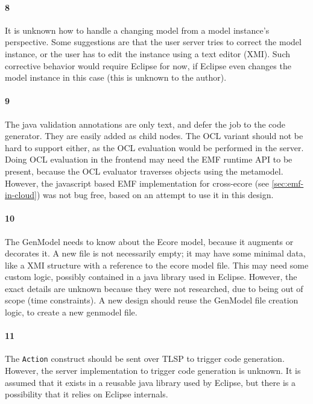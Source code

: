 \paragraph{8} It is unknown how to handle a changing model from a model instance's perspective.
Some suggestions are that the user server tries to correct the model instance, or the user has to edit the instance using a text editor (\acrshort{XMI}).
Such corrective behavior would require \gls{Eclipse} for now, if \gls{Eclipse} even changes the model instance in this case (this is unknown to the author).

\paragraph{9} The java validation annotations are only text, and defer the job to the code generator.
They are easily added as child nodes.
The \acrshort{OCL} variant should not be hard to support either, as the OCL evaluation would be performed in the server.
Doing OCL evaluation in the frontend may need the \acrshort{EMF} runtime \acrshort{API} to be present, because the OCL evaluator traverses objects using the metamodel.
However, the javascript based \acrshort{EMF} implementation for cross-ecore (see \cref{sec:emf-in-cloud}) was not bug free, based on an attempt to use it in this design.

\paragraph{10} The GenModel needs to know about the \gls{Ecore} model, because it augments or decorates it.
A new file is not necessarily empty; it may have some minimal data, like a \acrshort{XMI} structure with a reference to the ecore model file.
This may need some custom logic, possibly contained in a java library used in \gls{Eclipse}.
However, the exact details are unknown because they were not researched, due to being out of scope (time constraints).
A new design should reuse the GenModel file creation logic, to create a new genmodel file.

\paragraph{11} The \texttt{Action} construct should be sent over \acrshort{TLSP} to trigger code generation.
However, the server implementation to trigger code generation is unknown.
It is assumed that it exists in a reusable java library used by \gls{Eclipse}, but there is a possibility that it relies on \gls{Eclipse} internals.

